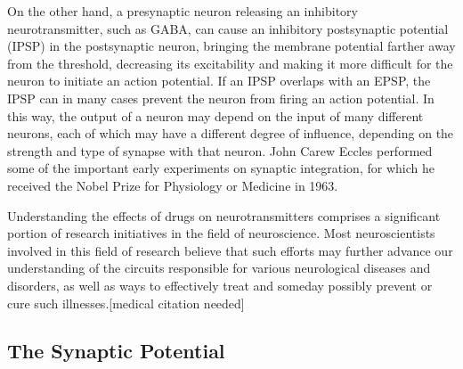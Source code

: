 \documentclass[]{book}
\begin{document}
On the other hand, a presynaptic neuron releasing an inhibitory neurotransmitter, such as GABA, can cause an inhibitory postsynaptic potential (IPSP) in the postsynaptic neuron, bringing the membrane potential farther away from the threshold, decreasing its excitability and making it more difficult for the neuron to initiate an action potential. If an IPSP overlaps with an EPSP, the IPSP can in many cases prevent the neuron from firing an action potential. In this way, the output of a neuron may depend on the input of many different neurons, each of which may have a different degree of influence, depending on the strength and type of synapse with that neuron. John Carew Eccles performed some of the important early experiments on synaptic integration, for which he received the Nobel Prize for Physiology or Medicine in 1963.

Understanding the effects of drugs on neurotransmitters comprises a significant portion of research initiatives in the field of neuroscience. Most neuroscientists involved in this field of research believe that such efforts may further advance our understanding of the circuits responsible for various neurological diseases and disorders, as well as ways to effectively treat and someday possibly prevent or cure such illnesses.{[}medical citation needed{]}

\hypertarget{the-synaptic-potential}{%
\subsection{The Synaptic Potential}\label{the-synaptic-potential}}
\end{document}
